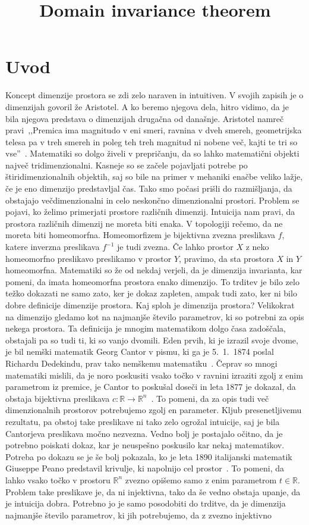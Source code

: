 \documentclass[mat1]{fmfdelo}
\title{Domain invariance theorem}
\newcommand{\R}{\mathbb R}
\newcommand{\0}{\underline{0}}
\def\citat#1{,,#1''}
\begin{document}
\section{Uvod}
Koncept dimenzije prostora se zdi zelo naraven in intuitiven. V svojih zapisih je o dimenzijah govoril že Aristotel. A ko beremo njegova dela, hitro vidimo, da je bila njegova predstava o dimenzijah drugačna od današnje. Aristotel namreč pravi~\citat{Premica ima magnitudo v eni smeri, ravnina v dveh smereh, geometrijska telesa pa v treh smereh in poleg teh treh magnitud ni nobene več, kajti te tri so vse}~\cite[str.\ 1, moj prevod]{4dim}. Matematiki so dolgo živeli v prepričanju, da so lahko matematični objekti največ tridimenzionalni. Kasneje so se začele pojavljati potrebe po štiridimenzionalnih objektih, saj so bile na primer v mehaniki enačbe veliko lažje, če je eno dimenzijo predstavljal čas. Tako smo počasi prišli do razmišljanja, da obstajajo večdimenzionalni in celo neskončno dimenzionalni prostori. Problem se pojavi, ko želimo primerjati prostore različnih dimenzij. Intuicija nam pravi, da prostora različnih dimenzij ne moreta biti enaka. V topologiji rečemo, da ne moreta biti homeomorfna. Homeomorfizem je bijektivna zvezna preslikava $f$, katere inverzna preslikava $f^{-1}$ je tudi zvezna. Če lahko prostor $X$ z neko homeomorfno preslikavo preslikamo v prostor $Y$, pravimo, da sta prostora $X$ in $Y$ homeomorfna. Matematiki so že od nekdaj verjeli, da je dimenzija invarianta, kar pomeni, da imata homeomorfna prostora enako dimenzijo. To trditev je bilo zelo težko dokazati ne samo zato, ker je dokaz zapleten, ampak tudi zato, ker ni bilo dobre definicije dimenzije prostora. Kaj sploh je dimenzija prostora? Velikokrat na dimenzijo gledamo kot na najmanjše število parametrov, ki so potrebni za opis nekega prostora. Ta definicija je mnogim matematikom dolgo časa zadoščala, obstajali pa so tudi ti, ki so vanjo dvomili. Eden prvih, ki je izrazil svoje dvome, je bil nemški matematik Georg Cantor v pismu, ki ga je 5.\ 1.\ 1874 poslal Richardu Dedekindu, prav tako nemškemu matematiku~\cite[str.\ 201]{Gouvea2011}. Čeprav so mnogi matematiki mislili, da je noro poskusiti vsako točko v ravnini izraziti zgolj z enim parametrom iz premice, je Cantor to poskušal doseči in leta 1877 je dokazal, da obstaja bijektivna preslikava $c : \R \to \R^n$~\cite[str.\ 203]{Gouvea2011}. To pomeni, da za opis tudi več dimenzionalnih prostorov potrebujemo zgolj en parameter. Kljub presenetljivemu rezultatu, pa obstoj take preslikave ni tako zelo ogrožal intuicije, saj je bila Cantorjeva preslikava močno nezvezna. Vedno bolj je postajalo očitno, da je potrebno poiskati dokaz, kar je neuspešno poskusilo kar nekaj matematikov. Potreba po dokazu se je še bolj pokazala, ko je leta 1890 italijanski matematik Giuseppe Peano predstavil krivulje, ki napolnijo cel prostor~\cite{Peano}. To pomeni, da lahko vsako točko v prostoru $\R^n$ zvezno opišemo samo z enim parametrom $t \in \R$. Problem take preslikave je, da ni injektivna, tako da še vedno obstaja upanje, da je intuicija dobra. Potrebno jo je samo posodobiti do trditve, da je dimenzija najmanjše število parametrov, ki jih potrebujemo, da z zvezno injektivno 
\end{document}
